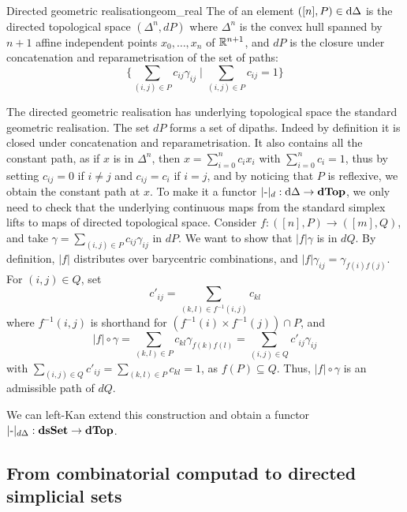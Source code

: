 \begin{cdef}{Directed geometric realisation}{geom_real}
    The  of an element \( ([n], P) \in \mathrm{d}\Delta \) is the directed topological space \( (\Delta^n, dP) \) where \( \Delta^n \) is the convex hull spanned by \( n + 1 \) affine independent points \( x_0, \dots, x_n \) of \( \mathbb{R}^{n+1} \), and \( dP \) is the closure under concatenation and reparametrisation of the set of paths:
    \begin{equation*}
        \{ \sum_{(i,j) \in P} c_{ij} \gamma_{ij} \mid \sum_{(i,j) \in P} c_{ij} = 1 \}
    \end{equation*}
\end{cdef}
The directed geometric realisation has underlying topological space the standard geometric realisation. The set \( dP \) forms a set of dipaths. Indeed by definition it is closed under concatenation and reparametrisation. It also contains all the constant path, as if \( x \) is in \( \Delta^n \), then \( x = \sum_{i=0}^n c_ix_i \) with \( \sum_{i=0}^n c_i = 1 \), thus by setting \( c_{ij} = 0 \) if \( i \neq j \) and \( c_{ij} = c_i \) if \( i = j \), and by noticing that \( P \) is reflexive, we obtain the constant path at \( x \). To make it a functor \( |\mbox{-}|_d : \mathrm{d}\Delta \to \mathbf{dTop} \), we only need to check that the underlying continuous maps from the standard simplex lifts to maps of directed topological space. Consider \( f : ([n], P) \to ([m], Q) \), and take \( \gamma = \sum_{(i,j) \in P} c_{ij} \gamma_{ij} \) in \( dP \). We want to show that \( |f|\gamma \) is in \( dQ \). By definition, \( |f| \) distributes over barycentric combinations, and \( |f|\gamma_{ij} = \gamma_{f(i)f(j)} \). For \( (i, j) \in Q \), set
\begin{equation*}
    c'_{ij} = \sum_{(k, l) \in f^{-1}(i, j)} c_{kl}
\end{equation*}
where \( f^{-1}(i, j) \) is shorthand for \( (f^{-1}(i)\times f^{-1}(j))\cap P \), and 
\begin{equation*}
    |f| \circ \gamma = \sum_{(k,l) \in P} c_{kl} \gamma_{f(k)f(l)} =  \sum_{(i,j) \in Q} c'_{ij} \gamma_{ij} 
\end{equation*}
with \( \sum_{(i,j) \in Q} c'_{ij} = \sum_{(k,l) \in P} c_{kl} = 1 \), as \( f(P) \subseteq Q \). Thus, \( |f| \circ \gamma \) is an admissible path of \( dQ \).

We can left-Kan extend this construction and obtain a functor \( |\mbox{-}|_{d\Delta} : \mathbf{dsSet} \to \mathbf{dTop} \).

\subsection{From combinatorial computad to directed simplicial sets}


